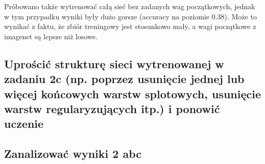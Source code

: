 Próbowano także wytrenować całą sieć bez zadanych wag początkowych, jednak w tym przypadku wyniki były dużo gorsze (accuracy na poziomie 0.38). Może to wynikać z faktu, że zbiór treningowy jest stosunkowo mały, a wagi początkowe z imagenet są lepsze niż losowe.

\subsection{Uprościć strukturę sieci wytrenowanej w zadaniu 2c (np. poprzez
usunięcie jednej lub więcej końcowych warstw splotowych, usunięcie
warstw regularyzujących itp.) i ponowić uczenie}

\subsection{Zanalizować wyniki 2 abc}
